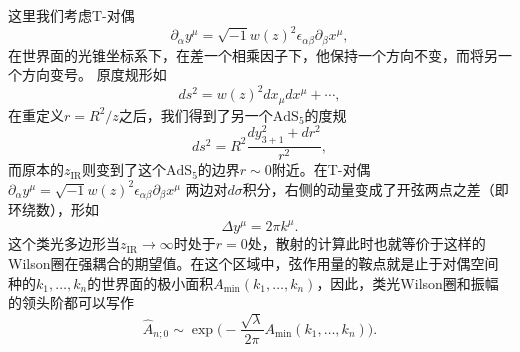 \documentclass[10pt]{article}
\begin{document}
这里我们考虑T-对偶
\[
	\partial_\alpha y^\mu = \sqrt{-1}w(z)^2\epsilon_{\alpha\beta}\partial_\beta x^\mu,
\]
在世界面的光锥坐标系下，在差一个相乘因子下，他保持一个方向不变，而将另一个方向变号。
原度规形如
\[
	ds^2=w(z)^2dx_\mu dx^\mu+\cdots,
\]
在重定义$r=R^2/z$之后，我们得到了另一个$\text{AdS}_5$的度规
\[
	ds^2=R^2\frac{dy^2_{3+1}+dr^2}{r^2},
\]
而原本的$z_{\text{IR}}$则变到了这个$\text{AdS}_5$的边界$r\sim 0$附近。在T-对偶
$\partial_\alpha y^\mu = \sqrt{-1}w(z)^2\epsilon_{\alpha\beta}\partial_\beta x^\mu$
两边对$d\sigma$积分，右侧的动量变成了开弦两点之差（即环绕数），形如
\[
	\Delta y^\mu=2\pi k^\mu.
\]
这个类光多边形当$z_{\text{IR}}\to \infty$时处于$r=0$处，散射的计算此时也就等价于这样的Wilson圈在强耦合的期望值。在这个区域中，弦作用量的鞍点就是止于对偶空间种的$k_1,\dots,k_n$的世界面的极小面积$A_{\text{min}}(k_1,\dots,k_n)$，因此，类光Wilson圈和振幅的领头阶都可以写作
\[
    \widehat A_{n;0}\sim \exp\bigl(-\frac{\sqrt{\lambda}}{2\pi}A_{\text{min}}(k_1,\dots,k_n)\bigr).
\]

\end{document}
